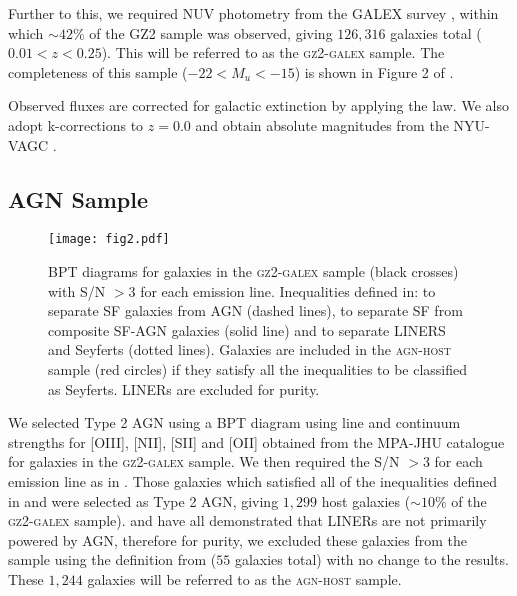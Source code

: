 \documentclass[useAMS,usenatbib]{mn2e}
\def\changed    {\color{nc} }
\begin{document}
Further to this, we required NUV photometry from the GALEX survey \citep{Martin05}, within which $\sim42\%$ of the GZ2 sample was observed, giving $126, 316$ galaxies total ($0.01 < z < 0.25$). This will be referred to as the \textsc{gz2-galex} sample. The completeness of this sample ($-22 < M_u < -15$) is shown in Figure 2 of \cite{Sme2015}. 

{\changed Observed fluxes are corrected for galactic extinction \citep{Oh11} by applying the \citet*{Cardelli89} law. We also adopt k-corrections to $z = 0.0$ and obtain absolute magnitudes from the NYU-VAGC \citep{Blanton05, Pad08, BR07}.}

\subsection{AGN Sample}\label{agnsample}

\begin{figure*}
\texttt{[image: fig2.pdf]}
\caption{BPT diagrams for galaxies in the \textsc{gz2-galex} sample (black crosses) with S/N $> 3$ for each emission line. Inequalities defined in: \protect\cite{Kew01} to separate SF galaxies from AGN (dashed lines), \protect\cite{Kauff03b} to separate SF from composite SF-AGN galaxies (solid line) and \protect\cite{Kew06} to separate LINERS and Seyferts (dotted lines). Galaxies are included in the \textsc{agn-host} sample (red circles) if they satisfy all the inequalities to be classified as Seyferts. LINERs are excluded for purity.}
\label{bpt}
\end{figure*}

We selected Type 2 AGN using a BPT diagram \citep{bpt81} using line and continuum strengths for [OIII], [NII], [SII] and [OII] obtained from the MPA-JHU catalogue \citep{Kauff03, Brinch04} for galaxies in the \textsc{gz2-galex} sample. We then required the S/N $> 3$ for each emission line as in \cite{Sch2010}. Those galaxies which satisfied all of the inequalities defined in \cite{Kew01} and \cite{Kauff03b} were selected as Type 2 AGN, giving $1,299$ host galaxies ($\sim10\%$ of the \textsc{gz2-galex} sample). \cite{Sarzi10, RB12} and \cite{Singh13} have all demonstrated that LINERs are not primarily powered by AGN, therefore for purity, we excluded these galaxies from the sample using the definition from \cite{Kew06} ($55$ galaxies total) with no change to the results. These $1,244$ galaxies will be referred to as the \textsc{agn-host} sample. 
\end{document}
